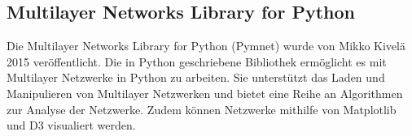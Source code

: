 \subsection{Multilayer Networks Library for Python}

Die Multilayer Networks Library for Python (Pymnet) wurde von Mikko Kivelä 2015 veröffentlicht. 
Die in Python geschriebene Bibliothek ermöglicht es mit Multilayer Netzwerke in Python zu arbeiten. Sie unterstützt das Laden und Manipulieren von Multilayer Netzwerken und bietet eine Reihe an Algorithmen zur Analyse der Netzwerke.
Zudem können Netzwerke mithilfe von Matplotlib und D3 visualiert werden.
